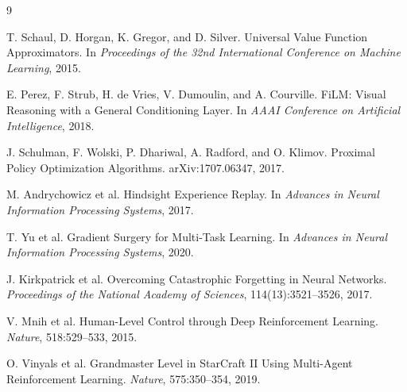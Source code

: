 \documentclass[11pt]{article}
\begin{document}
\begin{thebibliography}{9}

T. Schaul, D. Horgan, K. Gregor, and D. Silver.
\newblock Universal Value Function Approximators.
\newblock In \emph{Proceedings of the 32nd International Conference on Machine Learning}, 2015.

E. Perez, F. Strub, H. de Vries, V. Dumoulin, and A. Courville.
\newblock FiLM: Visual Reasoning with a General Conditioning Layer.
\newblock In \emph{AAAI Conference on Artificial Intelligence}, 2018.

J. Schulman, F. Wolski, P. Dhariwal, A. Radford, and O. Klimov.
\newblock Proximal Policy Optimization Algorithms.
\newblock arXiv:1707.06347, 2017.

M. Andrychowicz et al.
\newblock Hindsight Experience Replay.
\newblock In \emph{Advances in Neural Information Processing Systems}, 2017.

T. Yu et al.
\newblock Gradient Surgery for Multi-Task Learning.
\newblock In \emph{Advances in Neural Information Processing Systems}, 2020.

J. Kirkpatrick et al.
\newblock Overcoming Catastrophic Forgetting in Neural Networks.
\newblock \emph{Proceedings of the National Academy of Sciences}, 114(13):3521--3526, 2017.

V. Mnih et al.
\newblock Human-Level Control through Deep Reinforcement Learning.
\newblock \emph{Nature}, 518:529--533, 2015.

O. Vinyals et al.
\newblock Grandmaster Level in StarCraft II Using Multi-Agent Reinforcement Learning.
\newblock \emph{Nature}, 575:350--354, 2019.

\end{thebibliography}
\end{document}
